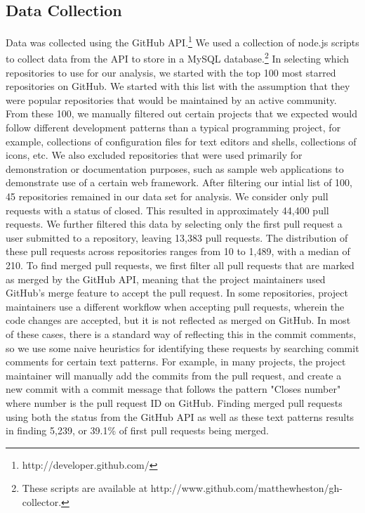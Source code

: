 \documentclass{sigchi}
\begin{document}
\subsection{Data Collection} \label{sec:datacollection}

Data was collected using the GitHub API.\footnote{http://developer.github.com/}
We used a collection of node.js scripts to collect data from the API to store in
a MySQL database.\footnote{These scripts are available at
http://www.github.com/matthewheston/gh-collector.} In selecting which
repositories to use for our analysis, we started with the top 100 most starred
repositories on GitHub. We started with this list with the assumption that they
were popular repositories that would be maintained by an active community. From
these 100, we manually filtered out certain projects that we expected would
follow different development patterns than a typical programming project, for
example, collections of configuration files for text editors and shells,
collections of icons, etc. We also excluded repositories that were used
primarily for demonstration or documentation purposes, such as sample web
applications to demonstrate use of a certain web framework. After filtering our
intial list of 100, 45 repositories remained in our data set for analysis. We
consider only pull requests with a status of closed. This resulted in
approximately 44,400 pull requests. We further filtered this data by selecting
only the first pull request a user submitted to a repository, leaving 13,383
pull requests. The distribution of these pull requests across repositories
ranges from 10 to 1,489, with a median of 210. To find merged pull requests, we
first filter all pull requests that are marked as merged by the GitHub API,
meaning that the project maintainers used GitHub's merge feature to accept the
pull request. In some repositories, project maintainers use a different workflow
when accepting pull requests, wherein the code changes are accepted, but it is
not reflected as merged on GitHub. In most of these cases, there is a standard
way of reflecting this in the commit comments, so we use some naive heuristics
for identifying these requests by searching commit comments for certain text
patterns. For example, in many projects, the project maintainer will manually
add the commits from the pull request, and create a new commit with a commit
message that follows the pattern "Closes {number}" where {number} is the pull
request ID on GitHub. Finding merged pull requests using both the status from
the GitHub API as well as these text patterns results in finding 5,239, or
39.1\% of first pull requests being merged.
\end{document}
